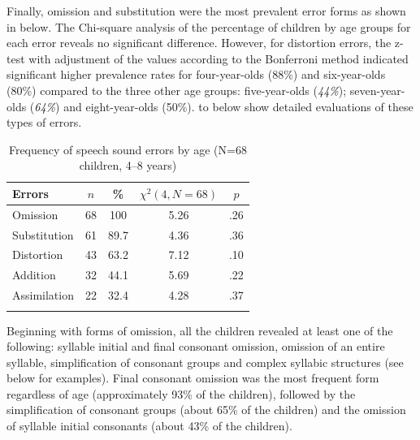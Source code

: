 \documentclass[output=paper,newtxmath,modfonts,nonflat,draftmode]{langsci/langscibook}
\begin{document}
{Finally,} omission and substitution were the most prevalent error forms as shown in  below. The Chi-square analysis of the percentage of children by age groups for each error reveals no significant difference. However, for distortion errors, the z-test with adjustment of the values according to the Bonferroni method indicated significant higher prevalence rates for four-year-olds (88\%) and six-year-olds (80\%) compared to the three other age groups: five-year-olds (\textit{44\%}); seven-year-olds (\textit{64\%}) and eight-year-olds (50\%).  to  below show detailed evaluations of these types of errors.

\begin{table}
\caption{Frequency of speech sound errors by age (N=68 children, 4--8 years)}
\label{tab:takam:7}
\begin{tabular}{lSSSS}
\lsptoprule
Errors &  &   &  & \\
\midrule
{O}mission     & 68 & 100    & 5.26 & .26\\
{S}ubstitution & 61 & 89.7   & 4.36 & .36\\
{D}istortion   & 43 & 63.2   & 7.12 & .10\\
Addition       & 32 & 44.1   & 5.69 & .22\\
Assimilation   & 22 & 32.4   & 4.28 & .37\\
\lspbottomrule
\end{tabular}
\end{table}


Beginning with forms of omission, all the children revealed at least one of the following: syllable initial and final consonant omission, omission of an entire syllable, simplification of consonant groups and complex syllabic structures (see  below for examples). Final consonant omission was the most frequent form regardless of age (approximately 93\% of the children), followed by the simplification of consonant groups (about 65\% of the children) and the omission of syllable initial consonants (about 43\% of the children). 


\end{document}
